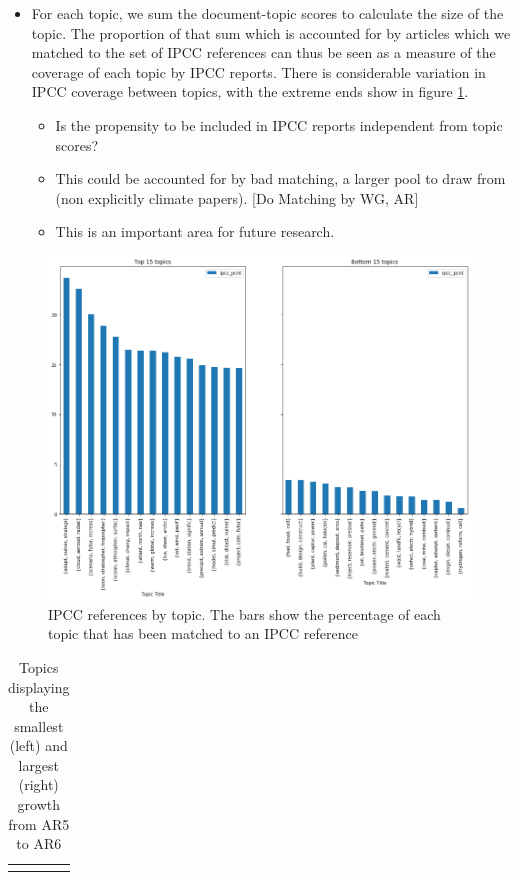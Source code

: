 \documentclass{article}
\begin{document}

\begin{itemize}
	\item For each topic, we sum the document-topic scores to calculate the size of the topic. The proportion of that sum which is accounted for by articles which we matched to the set of IPCC references can thus be seen as a measure of the coverage of each topic by IPCC reports. There is considerable variation in IPCC coverage between topics, with the extreme ends show in figure \ref{IPCC}.
	\begin{itemize}
		\item Is the propensity to be included in IPCC reports independent from topic scores?
		\item This could be accounted for by bad matching, a larger pool to draw from (non explicitly climate papers).  [Do Matching by WG, AR]
		\item This is an important area for future research.
	\end{itemize}
\end{itemize}


\begin{figure}
	\includegraphics[width=\linewidth]{plots/ipcc_topics_65}
    \caption{IPCC references by topic. The bars show the percentage of each topic that has been matched to an IPCC reference}
    \label{IPCC}
\end{figure}

\begin{table}
	\begin{center}
	\begin{tabular}{cc}
	 & 
	\end{tabular}
	\caption{Topics displaying the smallest (left) and largest (right) growth from AR5 to AR6}
	\end{center}
	\label{AR6}
\end{table}
\end{document}
